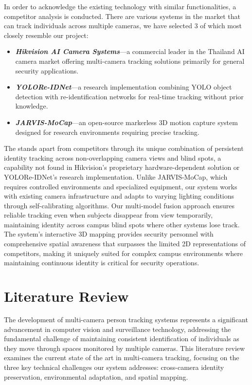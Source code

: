 In order to acknowledge the existing technology with similar functionalities, a competitor analysis is conducted.
There are various systems in the market that can track individuals across multiple cameras, we have selected 3 of which most closely resemble our project:

\begin{itemize}
    \item \textbf{\textit{Hikvision AI Camera Systems}}---a commercial leader in the Thailand AI camera market offering multi-camera tracking solutions primarily for general security applications.
    \item \textbf{\textit{YOLORe-IDNet}}---a research implementation combining YOLO object detection with re-identification networks for real-time tracking without prior knowledge.
    \item \textbf{\textit{JARVIS-MoCap}}---an open-source markerless 3D motion capture system designed for research environments requiring precise tracking.
\end{itemize}
\par
The \usevar{\srsTitle} stands apart from competitors through its unique combination of persistent identity tracking across non-overlapping camera views and blind spots, a capability not found in Hikvision's proprietary hardware-dependent solution or YOLORe-IDNet's research implementation. Unlike JARVIS-MoCap, which requires controlled environments and specialized equipment, our system works with existing camera infrastructure and adapts to varying lighting conditions through self-calibrating algorithms. Our multi-model fusion approach ensures reliable tracking even when subjects disappear from view temporarily, maintaining identity across campus blind spots where other systems lose track. The system's interactive 3D mapping provides security personnel with comprehensive spatial awareness that surpasses the limited 2D representations of competitors, making it uniquely suited for complex campus environments where maintaining continuous identity is critical for security operations.

\section{Literature Review}
\label{section:literature-review}


The development of multi-camera person tracking systems represents a significant advancement in computer vision and surveillance technology, addressing the fundamental challenge of maintaining consistent identification of individuals as they move through spaces monitored by multiple cameras. This literature review examines the current state of the art in multi-camera tracking, focusing on the three key technical challenges our system addresses: cross-camera identity preservation, environmental adaptation, and spatial mapping.

